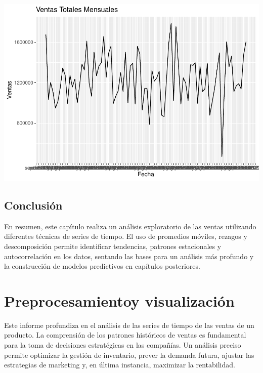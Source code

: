 \documentclass[
]{book}
\begin{document}
\includegraphics{_main_files/figure-latex/unnamed-chunk-10-1.pdf}

\section{Conclusión}\label{conclusiuxf3n}

En resumen, este capítulo realiza un análisis exploratorio de las ventas utilizando diferentes técnicas de series de tiempo. El uso de promedios móviles, rezagos y descomposición permite identificar tendencias, patrones estacionales y autocorrelación en los datos, sentando las bases para un análisis más profundo y la construcción de modelos predictivos en capítulos posteriores.

\chapter{Preprocesamientoy visualización}\label{preprocesamientoy-visualizaciuxf3n}

Este informe profundiza en el análisis de las series de tiempo de las ventas de un producto. La comprensión de los patrones históricos de ventas es fundamental para la toma de decisiones estratégicas en las compañías. Un análisis preciso permite optimizar la gestión de inventario, prever la demanda futura, ajustar las estrategias de marketing y, en última instancia, maximizar la rentabilidad.
\end{document}
